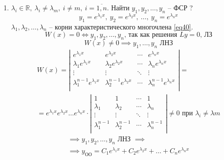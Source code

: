 \begin{note}
    \begin{enumerate}
        \item $\lambda_i \in \mathbb{R}, \ \lambda_i \ne \lambda_m, \ i \ne m, \ i = \overline{1,n}$. Найти $y_1,y_2,\ldots,y_n$ -- ФСР ?
              \[
                  y_1= e^{\lambda_1 x}, \ y_2=e^{\lambda_2x},\ \ldots, \ y_n=e^{\lambda_nx}
              \]
              $\lambda_1,\lambda_2,\ldots,\lambda_n$ -- корни характеристического многочлена \ref{eq40}.
              \[
                  W(x) = 0 \iff y_1,y_2,\ldots,y_n\text{, так как решения }Ly = 0\text{, ЛЗ}
              \]
              \[
                  W(x)\ne 0 \implies y_1,\ldots,y_n\text{ ЛНЗ}
              \]
              \begin{multline*}
                  W(x) = \left|\begin{matrix}
                      e^{\lambda_1x}                & e^{\lambda_2x}                & \cdots & e^{\lambda_nx}                \\
                      \lambda_1e^{\lambda_1x}       & \lambda_2e^{\lambda_2x}       & \cdots & \lambda_ne^{\lambda_nx}       \\
                      \vdots                        & \vdots                        & \ddots & \vdots                        \\
                      \lambda_1^{n-1}e^{\lambda_1x} & \lambda_2^{n-1}e^{\lambda_2x} & \cdots & \lambda_n^{n-1}e^{\lambda_nx} \\
                  \end{matrix}\right| = \\
                  = e^{\lambda_1x}e^{\lambda_2x}\ldots e^{\lambda_nx}\cdot \left|\begin{matrix}
                      1               & 1               & \cdots & 1               \\
                      \lambda_1       & \lambda_2       & \cdots & \lambda_n       \\
                      \vdots          & \vdots          & \ddots & \vdots          \\
                      \lambda_1^{n-1} & \lambda_2^{n-1} & \cdots & \lambda_n^{n-1} \\
                  \end{matrix}\right| \ne 0\text{ при }\lambda_i \ne \lambda m
              \end{multline*}
              \begin{multline*}
                  \implies y_1,y_2,\ldots,y_n\text{ ЛНЗ }\implies \\
                  \implies y_{\text{ОО}} = C_1e^{\lambda_1x} + C_2 e^{\lambda_2x} + \ldots + C_n e^{\lambda_nx}
              \end{multline*}


\end{enumerate}
\end{note}
